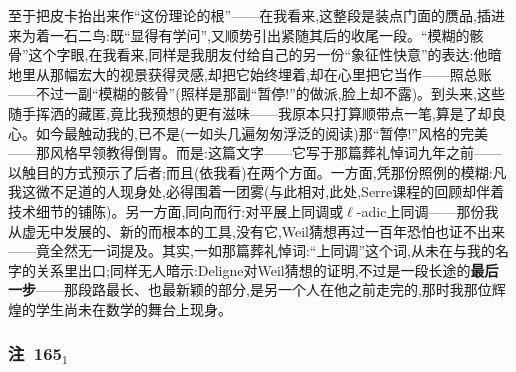 \dmark{}至于把皮卡抬出来作“这份理论的根”——在我看来,这整段是装点门面的赝品,插进来为着一石二鸟:既“显得有学问”,又顺势引出紧随其后的收尾一段。“模糊的骸骨”这个字眼,在我看来,同样是我朋友付给自己的另一份“象征性快意”的表达:他暗地里从那幅宏大的视景获得灵感,却把它始终埋着,却在心里把它当作——照总账——不过一副“模糊的骸骨”(照样是那副“暂停!”的做派,脸上却不露)。到头来,这些随手挥洒的藏匿,竟比我预想的更有滋味——我原本只打算顺带点一笔,算是了却良心。如今最触动我的,已不是(一如头几遍匆匆浮泛的阅读)那“暂停!”风格的完美——那风格早领教得倒胃。而是:这篇文字——它写于那篇葬礼悼词九年之前——以触目的方式预示了后者;而且(依我看)在两个方面。一方面,凭那份照例的模糊:凡我这微不足道的人现身处,必得围着一团雾(与此相对,此处,Serre课程的回顾却伴着技术细节的铺陈)。另一方面,同向而行:对平展上同调或$\ell$-adic上同调——那份我从虚无中发展的、新的而根本的工具,没有它,Weil猜想再过一百年恐怕也证不出来——竟全然\dmark{}无一词提及。其实,一如那篇葬礼悼词:“上同调”这个词,从未在与我的名字的关系里出口;同样无人暗示:Deligne对Weil猜想的证明,不过是一段长途的\textbf{最后一步}——那段路最长、也最新颖的部分,是另一个人在他之前走完的,那时我那位辉煌的学生尚未在数学的舞台上现身。

\subsubsection*{注~165$_{1}$}

